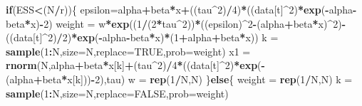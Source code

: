 \documentclass[
]{book}
\newenvironment{Shaded}{\begin{snugshade}}{\end{snugshade}}
\newcommand{\ControlFlowTok}[1]{\textcolor[rgb]{0.13,0.29,0.53}{\textbf{#1}}}
\newcommand{\DataTypeTok}[1]{\textcolor[rgb]{0.13,0.29,0.53}{#1}}
\newcommand{\DecValTok}[1]{\textcolor[rgb]{0.00,0.00,0.81}{#1}}
\newcommand{\KeywordTok}[1]{\textcolor[rgb]{0.13,0.29,0.53}{\textbf{#1}}}
\newcommand{\NormalTok}[1]{#1}
\newcommand{\OperatorTok}[1]{\textcolor[rgb]{0.81,0.36,0.00}{\textbf{#1}}}
\newcommand{\OtherTok}[1]{\textcolor[rgb]{0.56,0.35,0.01}{#1}}
\newcommand{\StringTok}[1]{\textcolor[rgb]{0.31,0.60,0.02}{#1}}
\theoremstyle{break}
\theoremstyle{nonumberplain}
\begin{document}
\begin{Shaded}
\begin{Highlighting}[]
    \ControlFlowTok{if}\NormalTok{(ESS}\OperatorTok{<}\NormalTok{(N}\OperatorTok{/}\NormalTok{r))\{}
\NormalTok{      epsilon=alpha}\OperatorTok{+}\NormalTok{beta}\OperatorTok{*}\NormalTok{x}\OperatorTok{+}\NormalTok{((tau}\OperatorTok{^}\DecValTok{2}\NormalTok{)}\OperatorTok{/}\DecValTok{4}\NormalTok{)}\OperatorTok{*}\NormalTok{((data[t]}\OperatorTok{^}\DecValTok{2}\NormalTok{)}\OperatorTok{*}\KeywordTok{exp}\NormalTok{(}\OperatorTok{-}\NormalTok{alpha}\OperatorTok{-}\NormalTok{beta}\OperatorTok{*}\NormalTok{x)}\OperatorTok{-}\DecValTok{2}\NormalTok{)}
\NormalTok{      weight =}\StringTok{ }\NormalTok{w}\OperatorTok{*}\KeywordTok{exp}\NormalTok{((}\DecValTok{1}\OperatorTok{/}\NormalTok{(}\DecValTok{2}\OperatorTok{*}\NormalTok{tau}\OperatorTok{^}\DecValTok{2}\NormalTok{))}\OperatorTok{*}\NormalTok{((epsilon)}\OperatorTok{^}\DecValTok{2}\OperatorTok{-}\NormalTok{(alpha}\OperatorTok{+}\NormalTok{beta}\OperatorTok{*}\NormalTok{x)}\OperatorTok{^}\DecValTok{2}\NormalTok{)}\OperatorTok{-}\NormalTok{((data[t]}\OperatorTok{^}\DecValTok{2}\NormalTok{)}\OperatorTok{/}\DecValTok{2}\NormalTok{)}\OperatorTok{*}\KeywordTok{exp}\NormalTok{(}\OperatorTok{-}\NormalTok{alpha}\OperatorTok{-}\NormalTok{beta}\OperatorTok{*}\NormalTok{x)}\OperatorTok{*}\NormalTok{(}\DecValTok{1}\OperatorTok{+}\NormalTok{alpha}\OperatorTok{+}\NormalTok{beta}\OperatorTok{*}\NormalTok{x))}
\NormalTok{      k   =}\StringTok{ }\KeywordTok{sample}\NormalTok{(}\DecValTok{1}\OperatorTok{:}\NormalTok{N,}\DataTypeTok{size=}\NormalTok{N,}\DataTypeTok{replace=}\OtherTok{TRUE}\NormalTok{,}\DataTypeTok{prob=}\NormalTok{weight)}
\NormalTok{      x1   =}\StringTok{ }\KeywordTok{rnorm}\NormalTok{(N,alpha}\OperatorTok{+}\NormalTok{beta}\OperatorTok{*}\NormalTok{x[k]}\OperatorTok{+}\NormalTok{(tau}\OperatorTok{^}\DecValTok{2}\NormalTok{)}\OperatorTok{/}\DecValTok{4}\OperatorTok{*}\NormalTok{((data[t]}\OperatorTok{^}\DecValTok{2}\NormalTok{)}\OperatorTok{*}\KeywordTok{exp}\NormalTok{(}\OperatorTok{-}\NormalTok{(alpha}\OperatorTok{+}\NormalTok{beta}\OperatorTok{*}\NormalTok{x[k]))}\OperatorTok{-}\DecValTok{2}\NormalTok{),tau)}
\NormalTok{      w   =}\StringTok{ }\KeywordTok{rep}\NormalTok{(}\DecValTok{1}\OperatorTok{/}\NormalTok{N,N)}
\NormalTok{    \}}\ControlFlowTok{else}\NormalTok{\{}
\NormalTok{      weight =}\StringTok{ }\KeywordTok{rep}\NormalTok{(}\DecValTok{1}\OperatorTok{/}\NormalTok{N,N)}
\NormalTok{      k   =}\StringTok{ }\KeywordTok{sample}\NormalTok{(}\DecValTok{1}\OperatorTok{:}\NormalTok{N,}\DataTypeTok{size=}\NormalTok{N,}\DataTypeTok{replace=}\OtherTok{FALSE}\NormalTok{,}\DataTypeTok{prob=}\NormalTok{weight)}

\end{Highlighting}
\end{Shaded}
\end{document}
